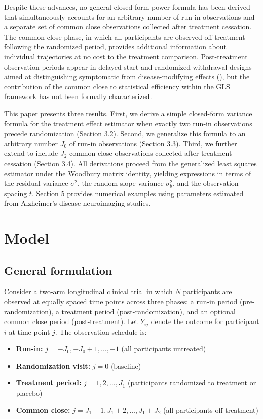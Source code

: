 \documentclass[
  11pt,
]{article}
\providecommand{\tightlist}{%
  \setlength{\itemsep}{0pt}\setlength{\parskip}{0pt}}
\begin{document}
Despite these advances, no general closed-form power formula has been
derived that simultaneously accounts for an arbitrary number of run-in
observations and a separate set of common close observations collected
after treatment cessation. The common close phase, in which all
participants are observed off-treatment following the randomized period,
provides additional information about individual trajectories at no cost
to the treatment comparison. Post-treatment observation periods appear
in delayed-start and randomized withdrawal designs aimed at
distinguishing symptomatic from disease-modifying effects
(), but
the contribution of the common close to statistical efficiency within
the GLS framework has not been formally characterized.

This paper presents three results. First, we derive a simple closed-form
variance formula for the treatment effect estimator when exactly two
run-in observations precede randomization (Section 3.2). Second, we
generalize this formula to an arbitrary number \(J_0\) of run-in
observations (Section 3.3). Third, we further extend to include \(J_2\)
common close observations collected after treatment cessation (Section
3.4). All derivations proceed from the generalized least squares
estimator under the Woodbury matrix identity, yielding expressions in
terms of the residual variance \(\sigma^2\), the random slope variance
\(\sigma_b^2\), and the observation spacing \(t\). Section 5 provides
numerical examples using parameters estimated from Alzheimer's disease
neuroimaging studies.

\section{Model}\label{model}

\subsection{General formulation}\label{general-formulation}

Consider a two-arm longitudinal clinical trial in which \(N\)
participants are observed at equally spaced time points across three
phases: a run-in period (pre-randomization), a treatment period
(post-randomization), and an optional common close period
(post-treatment). Let \(Y_{ij}\) denote the outcome for participant
\(i\) at time point \(j\). The observation schedule is:

\begin{itemize}
\tightlist
\item
  \textbf{Run-in:} \(j = -J_0, -J_0+1, \ldots, -1\) (all participants
  untreated)
\item
  \textbf{Randomization visit:} \(j = 0\) (baseline)
\item
  \textbf{Treatment period:} \(j = 1, 2, \ldots, J_1\) (participants
  randomized to treatment or placebo)
\item
  \textbf{Common close:} \(j = J_1+1, J_1+2, \ldots, J_1+J_2\) (all
  participants off-treatment)
\end{itemize}
\end{document}
